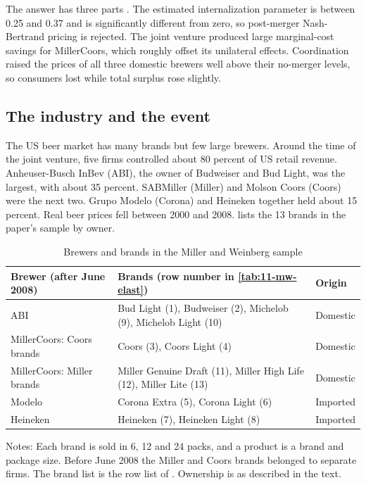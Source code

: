 The answer has three parts \citep[pp.~1781 and 1788]{MillerWeinberg2017}. The estimated internalization parameter is
between 0.25 and 0.37 and is significantly different from zero, so post-merger Nash-Bertrand pricing is rejected.
The joint venture produced large marginal-cost savings for MillerCoors, which roughly offset its unilateral effects.
Coordination raised the prices of all three domestic brewers well above their no-merger levels, so consumers lost
while total surplus rose slightly.

\subsection{The industry and the event}\label{sec:11-mc-industry}

The US beer market has many brands but few large brewers. Around the time of the joint venture, five firms
controlled about 80 percent of US retail revenue. Anheuser-Busch InBev (ABI), the owner of Budweiser and Bud Light, was the largest, with
about 35 percent. SABMiller (Miller) and Molson Coors (Coors) were the next two. Grupo Modelo (Corona) and Heineken
together held about 15 percent. Real beer prices fell between 2000 and 2008.  lists the 13
brands in the paper's sample by owner.

\begin{table}[htbp]
\centering
\caption{Brewers and brands in the Miller and Weinberg sample}
\label{tab:11-mw-brands}
\footnotesize
\begin{tabular}{@{}lll@{}}
\toprule
Brewer (after June 2008) & Brands (row number in \cref{tab:11-mw-elast}) & Origin \\
\midrule
ABI & Bud Light (1), Budweiser (2), Michelob (9), Michelob Light (10) & Domestic \\
MillerCoors: Coors brands & Coors (3), Coors Light (4) & Domestic \\
MillerCoors: Miller brands & Miller Genuine Draft (11), Miller High Life (12), Miller Lite (13) & Domestic \\
Modelo & Corona Extra (5), Corona Light (6) & Imported \\
Heineken & Heineken (7), Heineken Light (8) & Imported \\
\bottomrule
\end{tabular}

\smallskip
\begin{minipage}{0.95\linewidth}
\footnotesize Notes: Each brand is sold in 6, 12 and 24 packs, and a product is a brand and package size. Before June
2008 the Miller and Coors brands belonged to separate firms. The brand list is the row list of
\citet[Table V]{MillerWeinberg2017}. Ownership is as described in the text.
\end{minipage}
\end{table}

